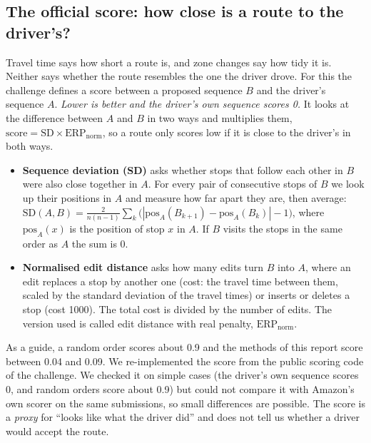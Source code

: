 \documentclass[11pt,a4paper]{article}
\begin{document}
\subsection{The official score: how close is a route to the driver's?}
Travel time says how short a route is, and zone changes say how tidy it is. Neither says whether the route resembles the one the driver drove. For this the challenge defines a score between a proposed sequence $B$ and the driver's sequence $A$. \emph{Lower is better and the driver's own sequence scores 0.} It looks at the difference between $A$ and $B$ in two ways and multiplies them, $\mathrm{score}=\mathrm{SD}\times\mathrm{ERP}_{\mathrm{norm}}$, so a route only scores low if it is close to the driver's in both ways.
\begin{itemize}
\item \textbf{Sequence deviation (SD)} asks whether stops that follow each other in $B$ were also close together in $A$. For every pair of consecutive stops of $B$ we look up their positions in $A$ and measure how far apart they are, then average:
$\mathrm{SD}(A,B)=\frac{2}{n(n-1)}\sum_{k}\bigl(|\mathrm{pos}_A(B_{k+1})-\mathrm{pos}_A(B_k)|-1\bigr)$, where $\mathrm{pos}_A(x)$ is the position of stop $x$ in $A$. If $B$ visits the stops in the same order as $A$ the sum is 0.
\item \textbf{Normalised edit distance} asks how many edits turn $B$ into $A$, where an edit replaces a stop by another one (cost: the travel time between them, scaled by the standard deviation of the travel times) or inserts or deletes a stop (cost 1000). The total cost is divided by the number of edits. The version used is called edit distance with real penalty, $\mathrm{ERP}_{\mathrm{norm}}$.
\end{itemize}
As a guide, a random order scores about 0.9 and the methods of this report score between 0.04 and 0.09. We re-implemented the score from the public scoring code of the challenge. We checked it on simple cases (the driver's own sequence scores 0, and random orders score about 0.9) but could not compare it with Amazon's own scorer on the same submissions, so small differences are possible. The score is a \emph{proxy} for ``looks like what the driver did'' and does not tell us whether a driver would accept the route.
\end{document}
